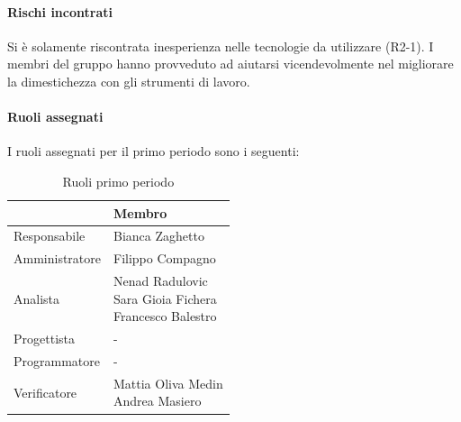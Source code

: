 \documentclass[a4paper,12pt]{article}
\begin{document}
            \paragraph*{Rischi incontrati}
                Si è solamente riscontrata inesperienza nelle tecnologie da utilizzare (R2-1). I membri del gruppo hanno provveduto ad aiutarsi vicendevolmente nel migliorare la dimestichezza con gli strumenti di lavoro.                
            \paragraph{Ruoli assegnati}
            I ruoli assegnati per il primo periodo sono i seguenti:
                \begin{table}[H]
                \centering
                \caption{Ruoli primo periodo}
                \begin{tabular}{|l|l|}
                \hline
                    \rowcolor{lightgray}{\textbf{Ruolo}} & {\textbf{Membro}} \\
                \hline
                    Responsabile & Bianca Zaghetto \\
                \hline
                    Amministratore & Filippo Compagno \\
                \hline
                    Analista & \makecell[l]{Nenad Radulovic \\ Sara Gioia Fichera \\ Francesco Balestro} \\
                \hline
                    Progettista & - \\
                \hline
                    Programmatore & - \\
                \hline
                    Verificatore & \makecell[l]{Mattia Oliva Medin \\ Andrea Masiero} \\
                \hline
                \end{tabular}
                \end{table}
            
\end{document}
